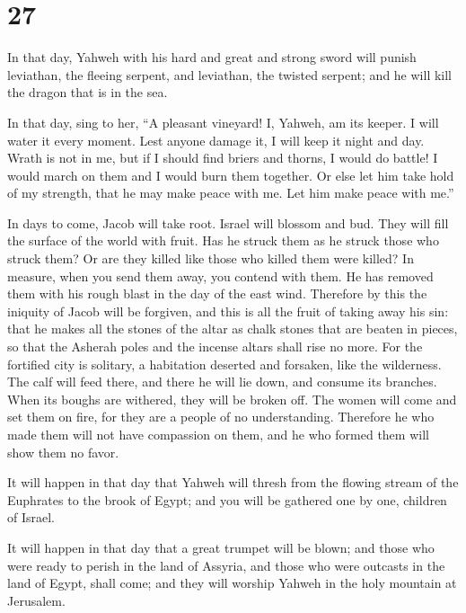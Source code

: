 \hypertarget{section-26}{%
\section{27}\label{section-26}}

 In that day, Yahweh with his hard and great and strong
sword will punish leviathan, the fleeing serpent, and leviathan, the
twisted serpent; and he will kill the dragon that is in the sea.

 In that day, sing to her, ``A pleasant vineyard!
 I, Yahweh, am its keeper. I will water it every moment.
Lest anyone damage it, I will keep it night and day. 
Wrath is not in me, but if I should find briers and thorns, I would do
battle! I would march on them and I would burn them together.
 Or else let him take hold of my strength, that he may
make peace with me. Let him make peace with me.''

 In days to come, Jacob will take root. Israel will
blossom and bud. They will fill the surface of the world with fruit.
 Has he struck them as he struck those who struck them? Or
are they killed like those who killed them were killed? 
In measure, when you send them away, you contend with them. He has
removed them with his rough blast in the day of the east wind.
 Therefore by this the iniquity of Jacob will be forgiven,
and this is all the fruit of taking away his sin: that he makes all the
stones of the altar as chalk stones that are beaten in pieces, so that
the Asherah poles and the incense altars shall rise no more.
 For the fortified city is solitary, a habitation
deserted and forsaken, like the wilderness. The calf will feed there,
and there he will lie down, and consume its branches. 
When its boughs are withered, they will be broken off. The women will
come and set them on fire, for they are a people of no understanding.
Therefore he who made them will not have compassion on them, and he who
formed them will show them no favor.

 It will happen in that day that Yahweh will thresh from
the flowing stream of the Euphrates to the brook of Egypt; and you will
be gathered one by one, children of Israel.

 It will happen in that day that a great trumpet will be
blown; and those who were ready to perish in the land of Assyria, and
those who were outcasts in the land of Egypt, shall come; and they will
worship Yahweh in the holy mountain at Jerusalem.

